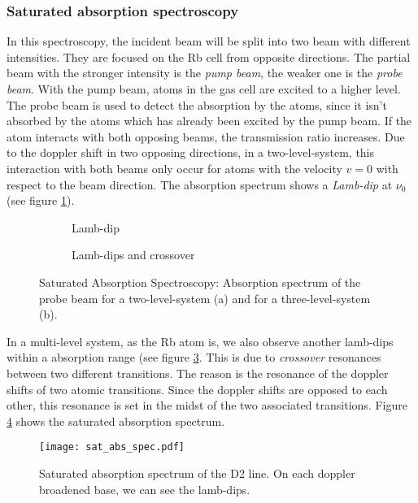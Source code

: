 \subsubsection{Saturated absorption spectroscopy}
In this spectroscopy, the incident beam will be split into two beam with different intensities. They are focused on the Rb cell from opposite directions. The partial beam with the stronger intensity is the \emph{pump beam}, the weaker one is the \emph{probe beam}. With the pump beam, atoms in the gas cell are excited to a higher level. The probe beam is used to detect the absorption by the atoms, since it isn't absorbed by the atoms which has already been excited by the pump beam. If the atom interacts with both opposing beams, the transmission ratio increases. Due to the doppler shift in two opposing directions, in a two-level-system, this interaction with both beams only occur for atoms with the velocity $v=0$ with respect to the beam direction. The absorption spectrum shows a \emph{Lamb-dip} at $\nu_0$ (see figure \ref{fig:lamb-dip}).
\begin{figure}[h]
	\centering
	\begin{subfigure}
		\texttt{[image: lamb-dip.pdf]}
		\caption{Lamb-dip}
		\label{fig:lamb-dip}
	\end{subfigure}
	\hfill
	\begin{subfigure}
		\texttt{[image: crossover.pdf]}
		\caption{Lamb-dips and crossover}
		\label{fig:crossover}
	\end{subfigure}
	\caption{Saturated Absorption Spectroscopy: Absorption spectrum of the probe beam for a two-level-system (a) and for a three-level-system (b).}
\end{figure}
In a multi-level system, as the Rb atom is, we also observe another lamb-dips within a absorption range (see figure \ref{fig:crossover}. This is due to \emph{crossover} resonances between two different transitions. The reason is the resonance of the doppler shifts of two atomic transitions. Since the doppler shifts are opposed to each other, this resonance is set in the midst of the two associated transitions.
Figure \ref{fig:sat_abs_spec} shows the saturated absorption spectrum.
\begin{figure}[h]
	\centering
	\texttt{[image: sat\_abs\_spec.pdf]}
	\caption{Saturated absorption spectrum of the D2 line. On each doppler broadened base, we can see the lamb-dips. \cite{lit:AK_manual2012}}
	\label{fig:sat_abs_spec}
\end{figure}
